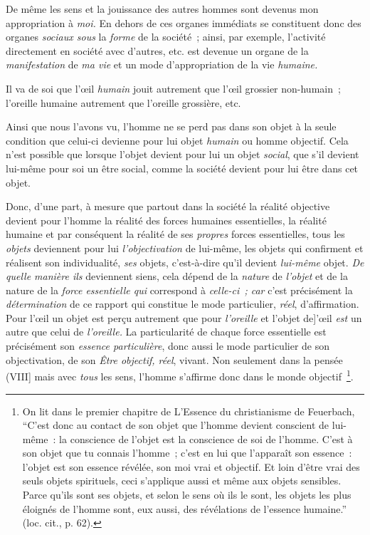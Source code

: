 \documentclass[french,twoside]{book} %
\begin{document}
De même les sens et la jouissance des autres hommes sont devenus mon appropriation à \emph{moi.} En dehors de ces organes immédiats se constituent donc des organes \emph{sociaux sous} la \emph{forme} de la société ; ainsi, par exemple, l’activité directement en société avec d’autres, etc. est devenue un organe de la \emph{manifestation} de \emph{ma vie} et un mode d’appropriation de la vie \emph{humaine.}\par
Il va de soi que l’œil \emph{humain} jouit autrement que l’œil grossier non-humain ; l’oreille humaine autrement que l’oreille grossière, etc.\par
Ainsi que nous l’avons vu, l’homme ne se perd pas dans son objet à la seule condition que celui-ci devienne pour lui objet \emph{humain} ou homme objectif. Cela n’est possible que lorsque l’objet devient pour lui un objet \emph{social}, que s’il devient lui-même pour soi un être social, comme la société devient pour lui être dans cet objet.\par
Donc, d’une part, à mesure que partout dans la société la réalité objective devient pour l’homme la réalité des forces humaines essentielles, la réalité humaine et par conséquent la réalité de ses \emph{propres} forces essentielles, tous les \emph{objets} deviennent pour lui \emph{l’objectivation} de lui-même, les objets qui confirment et réalisent son individualité, \emph{ses} objets, c’est-à-dire qu’il devient \emph{lui-même} objet. \emph{De quelle manière ils} deviennent siens, cela dépend de la \emph{nature} de \emph{l’objet} et de la nature de la \emph{force essentielle qui} correspond à \emph{celle-ci ; car} c’est précisément la \emph{détermination} de ce rapport qui constitue le mode particulier, \emph{réel}, d’affirmation. Pour l’œil un objet est perçu autrement que pour \emph{l’oreille} et l’objet de]'œil \emph{est} un autre que celui de \emph{l’oreille.} La particularité de chaque force essentielle est précisément son \emph{essence particulière}, donc aussi le mode particulier de son objectivation, de son \emph{Être objectif, réel}, vivant. Non seulement dans la pensée (VIII] mais avec \emph{tous} les sens, l’homme s’affirme donc dans le monde objectif \footnote{On lit dans le premier chapitre de L’Essence du christianisme de Feuerbach, “C’est donc au contact de son objet que l’homme devient conscient de lui-même : la conscience de l’objet est la conscience de soi de l’homme. C’est à son objet que tu connais l’homme ; c’est en lui que l’apparaît son essence : l’objet est son essence révélée, son moi vrai et objectif. Et loin d’être vrai des seuls objets spirituels, ceci s’applique aussi et même aux objets sensibles. Parce qu’ils sont ses objets, et selon le sens où ils le sont, les objets les plus éloignés de l’homme sont, eux aussi, des révélations de l’essence humaine.” (loc. cit., p. 62).}.\par
\end{document}
